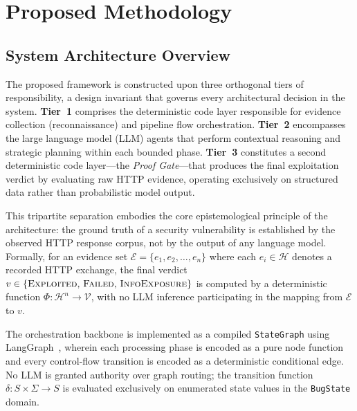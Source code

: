 
\section{Proposed Methodology}
\label{sec:methodology}

\subsection{System Architecture Overview}
\label{subsec:arch_overview}

The proposed framework is constructed upon three orthogonal tiers of
responsibility, a design invariant that governs every architectural
decision in the system.
\textbf{Tier~1} comprises the deterministic code layer responsible for
evidence collection (reconnaissance) and pipeline flow orchestration.
\textbf{Tier~2} encompasses the large language model (LLM) agents that
perform contextual reasoning and strategic planning within each bounded
phase.
\textbf{Tier~3} constitutes a second deterministic code layer---the
\emph{Proof Gate}---that produces the final exploitation verdict by
evaluating raw HTTP evidence, operating exclusively on structured data
rather than probabilistic model output.

This tripartite separation embodies the core epistemological principle
of the architecture: the ground truth of a security vulnerability is
established by the observed HTTP response corpus, not by the output of
any language model.
Formally, for an evidence set
$\mathcal{E} = \{e_1, e_2, \ldots, e_n\}$
where each $e_i \in \mathcal{H}$ denotes a recorded HTTP exchange, the
final verdict
$v \in \{\textsc{Exploited},\, \textsc{Failed},\, \textsc{InfoExposure}\}$
is computed by a deterministic function
$\Phi: \mathcal{H}^{n} \to \mathcal{V}$,
with no LLM inference participating in the mapping from
$\mathcal{E}$ to $v$.

The orchestration backbone is implemented as a compiled
\texttt{StateGraph} using LangGraph~\cite{langgraph2024}, wherein each
processing phase is encoded as a pure node function and every
control-flow transition is encoded as a deterministic conditional edge.
No LLM is granted authority over graph routing; the transition function
$\delta: S \times \Sigma \to S$
is evaluated exclusively on enumerated state values in the
\texttt{BugState} domain.

